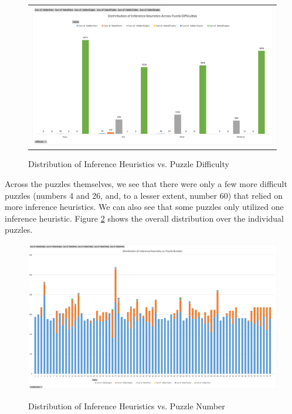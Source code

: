 \documentclass{article}
\begin{document}
\begin{figure}[H]%
	\centering\begin{tabular}{c}
		\includegraphics[scale=0.4]{plots/dist-inf-heuristics-vs-puzzle-diff.png}\\
	\end{tabular}
	\caption{Distribution of Inference Heuristics vs. Puzzle Difficulty}%
	\label{fig:dist_inf_vs_puzzle_diff}%
\end{figure}

Across the puzzles themselves, we see that there were only a few more difficult puzzles (numbers 4 and 26, and, to a lesser extent, number 60) that relied on more inference heuristics. We can also see that some puzzles only utilized one inference heuristic. Figure \ref{fig:dist_inf_vs_puzzle_num} shows the overall distribution over the individual puzzles.\\ 

\begin{figure}
	\centering
	\includegraphics[scale=0.50]{plots/dist-inf-heuristics-vs-puzzle-number.png}\\	
	\caption{{Distribution of Inference Heuristics vs. Puzzle Number}}
	\label{fig:dist_inf_vs_puzzle_num}%
\end{figure}
\end{document}
